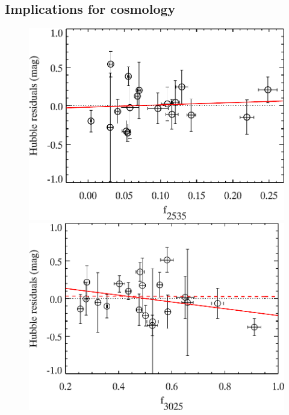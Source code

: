 \documentclass[useAMS,usenatbib]{mn2e}
\begin{document}
\subsection{Implications for cosmology}
\label{sec:cosmology}
\begin{figure}
	\centering
		\includegraphics[scale=0.5]{plot/ratio_uv_hrs_2535.pdf}\\
		\vspace{0.25cm}
		\includegraphics[scale=0.5]{plot/ratio_uv_hrs_3025.pdf}\\
		\vspace{0.25cm}

\end{figure}
\end{document}
